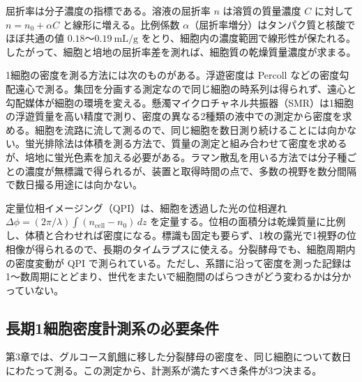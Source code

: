屈折率は分子濃度の指標である。溶液の屈折率 $n$ は溶質の質量濃度 $C$ に対して $n = n_0 + \alpha C$ と線形に増える。比例係数 $\alpha$（屈折率増分）はタンパク質と核酸でほぼ共通の値 $0.18$〜$0.19~\mathrm{mL/g}$ をとり、細胞内の濃度範囲で線形性が保たれる\cite{barer1952interference,barer1954refractive,zhao2011distribution,zangle2014live}。したがって、細胞と培地の屈折率差を測れば、細胞質の乾燥質量濃度が求まる。

1細胞の密度を測る方法には次のものがある。浮遊密度は Percoll などの密度勾配遠心で測る\cite{woldringh1981variation,kubitschek1985buoyant,bryan2010measurement}。集団を分画する測定なので同じ細胞の時系列は得られず、遠心と勾配媒体が細胞の環境を変える。懸濁マイクロチャネル共振器（SMR）は1細胞の浮遊質量を高い精度で測り、密度の異なる2種類の液中での測定から密度を求める\cite{grover2011measuring,bryan2010measurement}。細胞を流路に流して測るので、同じ細胞を数日測り続けることには向かない。蛍光排除法は体積を測る方法で、質量の測定と組み合わせて密度を求める\cite{zlotekzlotkiewicz2015optical}が、培地に蛍光色素を加える必要がある。ラマン散乱を用いる方法では分子種ごとの濃度が無標識で得られる\cite{oh2022protein}が、装置と取得時間の点で、多数の視野を数分間隔で数日撮る用途には向かない。

定量位相イメージング（QPI）は、細胞を透過した光の位相遅れ $\Delta\phi = (2\pi/\lambda)\int (n_{\mathrm{cell}} - n_0)\,dz$ を定量する\cite{barer1952interference,popescu2006diffraction,park2018quantitative,nguyen2022quantitative}。位相の面積分は乾燥質量に比例し、体積と合わせれば密度になる。標識も固定も要らず、1枚の露光で1視野の位相像が得られるので、長期のタイムラプスに使える。分裂酵母でも、細胞周期内の密度変動が QPI で測られている\cite{rappaz2009noninvasive,odermatt2021variations}。ただし、系譜に沿って密度を測った記録は1〜数周期にとどまり\cite{odermatt2021variations,liu2020computationally}、世代をまたいで細胞間のばらつきがどう変わるかは分かっていない。

\subsection{長期1細胞密度計測系の必要条件}
\label{sec:requirements}

第3章では、グルコース飢餓に移した分裂酵母の密度を、同じ細胞について数日にわたって測る。この測定から、計測系が満たすべき条件が3つ決まる。


